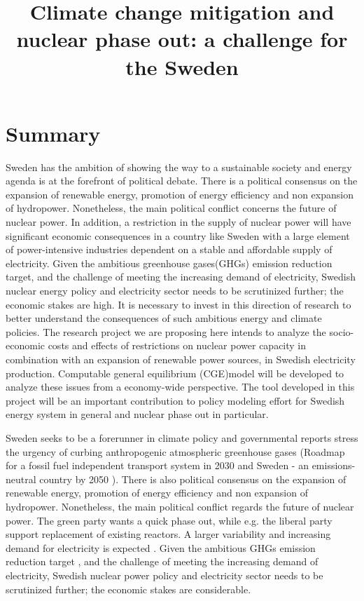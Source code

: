 


\title{Climate change mitigation and nuclear phase out: a challenge for the Sweden}
\maketitle
\author{}
\date{}
\section{Summary}
Sweden has the ambition of showing the way to a sustainable society and energy agenda is at the forefront of political debate. There is a political consensus on the expansion of renewable energy, promotion of energy efficiency and non expansion of hydropower. Nonetheless, the main political conflict concerns the future of nuclear power. In addition, a restriction in the supply of nuclear power will have significant economic consequences in a country like Sweden with a large element of power-intensive industries dependent on a stable and affordable supply of electricity. Given the ambitious greenhouse gases(GHGs) emission reduction target, and the challenge of meeting the increasing demand of electricity, Swedish nuclear energy policy and electricity sector needs to be scrutinized further; the economic stakes are high. It is necessary to invest in this direction of research to better understand the consequences of such ambitious energy and climate policies. The research project we are proposing here intends to analyze the socio-economic costs and effects of restrictions on nuclear power capacity in combination with an expansion of renewable power sources, in Swedish electricity production. Computable general equilibrium (CGE)model will be developed to analyze these issues from a economy-wide perspective. The tool developed in this project will be an important contribution to policy modeling effort for Swedish energy system in general and nuclear phase out in particular.

Sweden seeks to be a forerunner in climate policy and governmental reports stress the urgency of curbing anthropogenic atmospheric greenhouse gases (Roadmap for a fossil fuel independent transport system in 2030 \cite{SOU201384} and Sweden - an emissions-neutral country by 2050 \cite{sepa2012}). There is also political consensus on the expansion of renewable energy, promotion of energy efficiency and non expansion of hydropower. Nonetheless, the main political conflict regards the future of nuclear power. The green party wants a quick phase out, while e.g. the liberal party support replacement of existing reactors. A larger variability and increasing demand for electricity is expected \cite{sepa2012, SOU201384}. Given the ambitious GHGs emission reduction target \cite{SOU201384}, and the challenge of meeting the increasing demand of electricity, Swedish nuclear power policy and electricity sector needs to be scrutinized further; the economic stakes are considerable.


